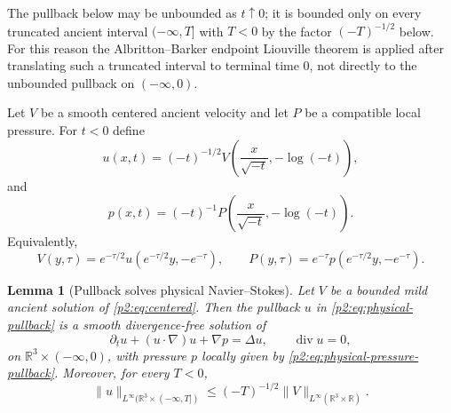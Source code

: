 \documentclass[11pt]{amsart}
\theoremstyle{plain}
\newtheorem{lemma}[lemma]{Lemma}
\theoremstyle{definition}
\theoremstyle{remark}
\numberwithin{equation}{section}
\newcommand{\R}{\mathbb R}
\newcommand{\divergence}{\operatorname{div}}
\begin{document}
The pullback below may be unbounded as \(t\uparrow0\); it is bounded only on
every truncated ancient interval \((-\infty,T]\) with \(T<0\) by the factor
\((-T)^{-1/2}\) below.  For this reason the Albritton--Barker endpoint Liouville
theorem is applied after translating such a truncated interval to terminal
time \(0\), not directly to the unbounded pullback on \((-\infty,0)\).

Let \(V\) be a smooth centered ancient velocity and let \(P\) be a compatible
local pressure.  For \(t<0\) define
\begin{equation}\label{p2:eq:physical-pullback}
   u(x,t)=(-t)^{-1/2}
   V\left(\frac{x}{\sqrt{-t}},-\log(-t)\right),
\end{equation}
and
\begin{equation}\label{p2:eq:physical-pressure-pullback}
   p(x,t)=(-t)^{-1}
   P\left(\frac{x}{\sqrt{-t}},-\log(-t)\right).
\end{equation}
Equivalently,
\[
   V(y,\tau)=e^{-\tau/2}u(e^{-\tau/2}y,-e^{-\tau}),
   \qquad
   P(y,\tau)=e^{-\tau}p(e^{-\tau/2}y,-e^{-\tau}).
\]

\begin{lemma}[Pullback solves physical Navier--Stokes]
\label{p2:lem:physical-pullback}
Let \(V\) be a bounded mild ancient solution of \eqref{p2:eq:centered}.  Then
the pullback \(u\) in \eqref{p2:eq:physical-pullback} is a smooth divergence-free
solution of
\begin{equation}\label{p2:eq:physical-NS}
   \partial_tu+(u\cdot\nabla)u+\nabla p=\Delta u,
   \qquad \divergence u=0,
\end{equation}
on \(\R^3\times(-\infty,0)\), with pressure \(p\) locally given by
\eqref{p2:eq:physical-pressure-pullback}.  Moreover, for every \(T<0\),
\[
   \|u\|_{L^\infty(\R^3\times(-\infty,T])}
   \le
   (-T)^{-1/2}\|V\|_{L^\infty(\R^3\times\R)}.
\]
\end{lemma}
\end{document}
